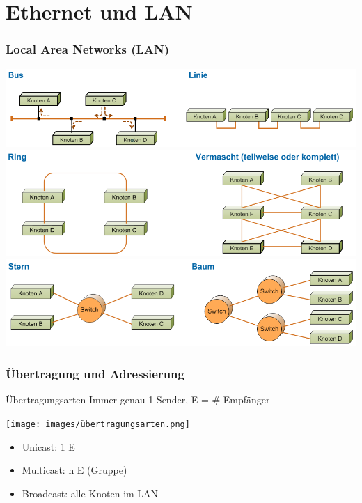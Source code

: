 \section{Ethernet und LAN}
\subsubsection{Local Area Networks (LAN)}

    \centering
    \includegraphics[width=0.9\linewidth]{images/bus_linie_topo.png}\\
    \includegraphics[width=0.9\linewidth]{images/ring_vermascht_topo.png}\\
    \includegraphics[width=0.9\linewidth]{images/stern_baum_topo.png}

\subsubsection{Übertragung und Adressierung}

\begin{definition}{Übertragungsarten}
    Immer genau 1 Sender, E = \# Empfänger
    
    \begin{minipage}{0.35\linewidth}
        \texttt{[image: images/übertragungsarten.png]}
    \end{minipage}
    \begin{minipage}{0.6\linewidth}
        \begin{itemize}
            \item Unicast: 1 E 
            \item Multicast: n E (Gruppe)
            \item Broadcast: alle Knoten im LAN
        \end{itemize}
    \end{minipage}
\end{definition}


